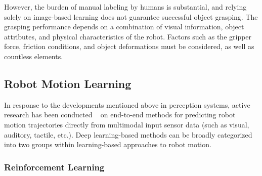 However, the burden of manual labeling by humans is substantial, and relying solely on image-based learning does not guarantee successful object grasping. The grasping performance depends on a combination of visual information, object attributes, and physical characteristics of the robot. Factors such as the gripper force, friction conditions, and object deformations must be considered, as well as countless elements.



\subsection{Robot Motion Learning}

In response to the developments mentioned above in perception systems, active research has been conducted ~\cite{Noda2014multimodal,Lee2019icra,lin2022tactilegym2} on end-to-end methods for predicting robot motion trajectories directly from multimodal input sensor data (such as visual, auditory, tactile, etc.). Deep learning-based methods can be broadly categorized into two groups within learning-based approaches to robot motion.



\subsubsection{Reinforcement Learning}

